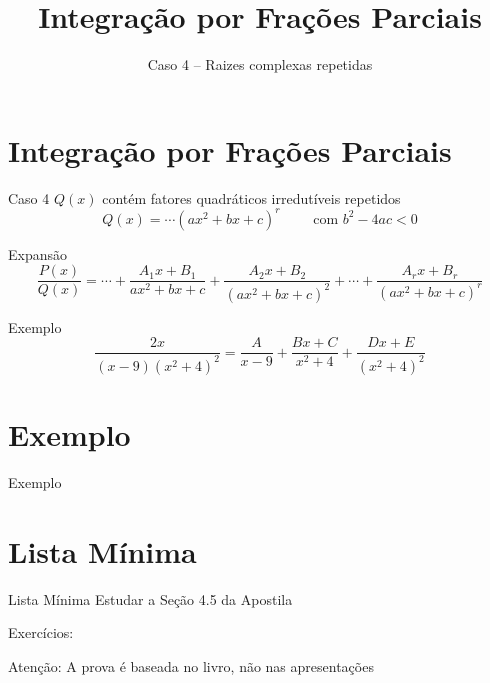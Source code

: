 \documentclass[fleqn,utf8,aspectratio=169,12pt]{beamer}
\title{Integração por Frações Parciais}
\subtitle{Caso 4 -- Raizes complexas repetidas}
\begin{document}
\addtitle

\section{Integração por Frações Parciais}

\begin{frame}{Caso 4}
  $Q(x)$ contém fatores quadráticos irredutíveis repetidos
  \[
    Q(x) = \cdots  \left( ax^2 + bx + c \right)^r
    \qquad
    \text{ com } b^2-4ac<0
  \]

  \pause
  Expansão
  \[
    \frac{P(x)}{Q(x)}
    = \cdots
    + \frac{A_1x+B_1}{ax^2+bx+c}
    + \frac{A_2x+B_2}{(ax^2+bx+c)^2}
    + \cdots
    + \frac{A_rx+B_r}{(ax^2+bx+c)^r}
  \]
\end{frame}

\begin{frame}{Exemplo}
\[
  \frac{2x}{(x-9)(x^2+4)^2}
  = \frac{A}{x-9}
  + \frac{Bx+C}{x^2+4}
  + \frac{Dx+E}{(x^2+4)^2}
\]
\end{frame}

\addtocounter{exemplo}{1}
\section{Exemplo \theexemplo}

\begin{frame}{Exemplo \theexemplo}
\end{frame}

\section{Lista Mínima}

\begin{frame}{Lista Mínima}
  Estudar a Seção 4.5 da Apostila

  Exercícios:

  \vfill
  Atenção: A prova é baseada no livro, não nas apresentações
\end{frame}

\end{document}
